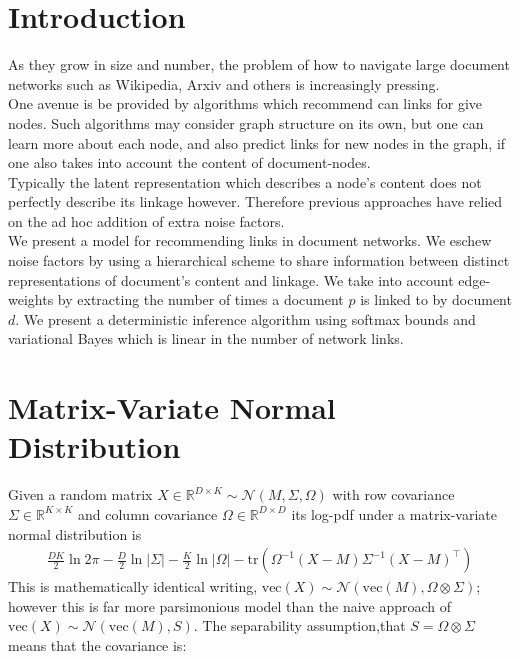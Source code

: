 \documentclass{sciposter}
\newcommand \vecf[1] {
    \text{vec}\left(#1\right)
}
\newcommand \halve[1] {
	\frac{#1}{2}
}
\newcommand \tr { \text{tr} }
\newcommand \T { ^\top }
\newcommand \nor[2]   { \mathcal{N} \left( {#1}, {#2} \right) }
\newcommand \mnor[3]  { \mathcal{N} \left(#1, #2, #3\right) }
\newcommand \Tr[1]   { \tr \left(  {#1}  \right) }
\newcommand \MReal[2] { { \mathbb{R}^{#1 \times #2} } }
\newcommand \inv[1] { {#1}^{-1} }
\begin{document}
\begin{multicols}{3}

\section{Introduction}
As they grow in size and number, the problem of how to navigate large document networks such as Wikipedia, Arxiv and others is increasingly pressing. \\

One avenue is be provided by algorithms which recommend can links for give nodes. Such algorithms may consider graph structure on its own\cite{Gopalan2013b}, but one can learn more about each node, and also predict links for new nodes in the graph, if one also takes into account the content of document-nodes. \\

Typically the latent representation which describes a node's content does not perfectly describe its linkage however. Therefore previous approaches have relied on the ad hoc addition of extra noise factors\cite{Chang2009a}\cite{Neiswanger2014}. \\

We present a model for recommending links in document networks. We eschew noise factors by using a hierarchical scheme to share information between distinct representations of document's content and linkage. We take into account edge-weights by extracting the number of times a document $p$ is linked to by document $d$. We present a deterministic inference algorithm using softmax bounds and variational Bayes which is linear in the number of network links.


\section{Matrix-Variate Normal Distribution}
Given a random matrix $X \in \MReal{D}{K} \sim \mnor{M}{\Sigma}{\Omega}$ with row covariance $\Sigma \in \MReal{K}{K}$ and column covariance $\Omega \in \MReal{D}{D}$ its log-pdf under a matrix-variate normal distribution is
\begin{align*}
\halve{DK}\ln 2\pi - \halve{D}\ln|\Sigma| - \halve{K} \ln|\Omega| -\Tr{\inv{\Omega}(X - M)\inv{\Sigma}(X - M)\T}
\end{align*}
This is mathematically identical writing, $\vecf{X} \sim \nor{\vecf{M}}{\Omega \otimes \Sigma}$; however this is far more parsimonious model than the naive approach of $\vecf{X} \sim \nor{\vecf{M}}{S}$. The separability assumption,that $S = \Omega \otimes \Sigma$ means that the covariance is:


\end{multicols}
\end{document}
